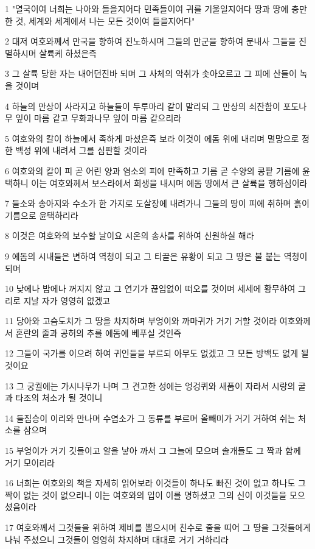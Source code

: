 \par 1 "열국이여 너희는 나아와 들을지어다 민족들이여 귀를 기울일지어다 땅과 땅에 충만한 것, 세계와 세계에서 나는 모든 것이여 들을지어다"
\par 2 대저 여호와께서 만국을 향하여 진노하시며 그들의 만군을 향하여 분내사 그들을 진멸하시며 살륙케 하셨은즉
\par 3 그 살륙 당한 자는 내어던진바 되며 그 사체의 악취가 솟아오르고 그 피에 산들이 녹을 것이며
\par 4 하늘의 만상이 사라지고 하늘들이 두루마리 같이 말리되 그 만상의 쇠잔함이 포도나무 잎이 마름 같고 무화과나무 잎이 마름 같으리라
\par 5 여호와의 칼이 하늘에서 족하게 마셨은즉 보라 이것이 에돔 위에 내리며 멸망으로 정한 백성 위에 내려서 그를 심판할 것이라
\par 6 여호와의 칼이 피 곧 어린 양과 염소의 피에 만족하고 기름 곧 수양의 콩팥 기름에 윤택하니 이는 여호와께서 보스라에서 희생을 내시며 에돔 땅에서 큰 살륙을 행하심이라
\par 7 들소와 송아지와 수소가 한 가지로 도살장에 내려가니 그들의 땅이 피에 취하며 흙이 기름으로 윤택하리라
\par 8 이것은 여호와의 보수할 날이요 시온의 송사를 위하여 신원하실 해라
\par 9 에돔의 시내들은 변하여 역청이 되고 그 티끌은 유황이 되고 그 땅은 불 붙는 역청이 되며
\par 10 낮에나 밤에나 꺼지지 않고 그 연기가 끊임없이 떠오를 것이며 세세에 황무하여 그리로 지날 자가 영영히 없겠고
\par 11 당아와 고슴도치가 그 땅을 차지하며 부엉이와 까마귀가 거기 거할 것이라 여호와께서 혼란의 줄과 공허의 추를 에돔에 베푸실 것인즉
\par 12 그들이 국가를 이으려 하여 귀인들을 부르되 아무도 없겠고 그 모든 방백도 없게 될 것이요
\par 13 그 궁궐에는 가시나무가 나며 그 견고한 성에는 엉겅퀴와 새품이 자라서 시랑의 굴과 타조의 처소가 될 것이니
\par 14 들짐승이 이리와 만나며 수염소가 그 동류를 부르며 올빼미가 거기 거하여 쉬는 처소를 삼으며
\par 15 부엉이가 거기 깃들이고 알을 낳아 까서 그 그늘에 모으며 솔개들도 그 짝과 함께 거기 모이리라
\par 16 너희는 여호와의 책을 자세히 읽어보라 이것들이 하나도 빠진 것이 없고 하나도 그 짝이 없는 것이 없으리니 이는 여호와의 입이 이를 명하셨고 그의 신이 이것들을 모으셨음이라
\par 17 여호와께서 그것들을 위하여 제비를 뽑으시며 친수로 줄을 띠어 그 땅을 그것들에게 나눠 주셨으니 그것들이 영영히 차지하며 대대로 거기 거하리라

